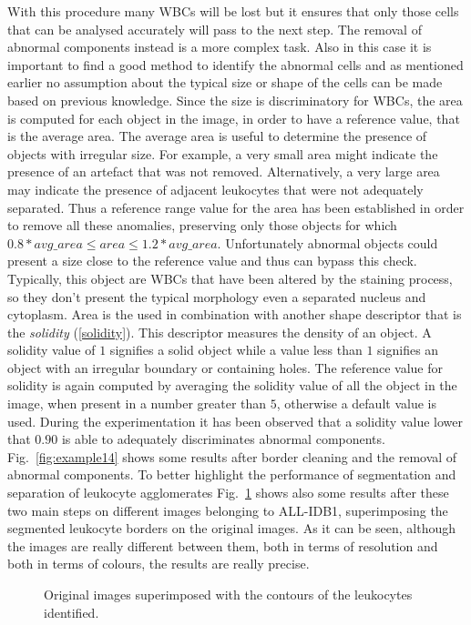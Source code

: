 \documentclass[final,a4paper,12pt,english]{UnicaPhdThesis3}
\begin{document}
	With this procedure many WBCs will be lost but it ensures that only those cells that can be analysed accurately will pass to the next step. The removal of abnormal components instead is a more complex task. Also in this case it is important to find a good method to identify the abnormal cells and as mentioned earlier no assumption about the typical size or shape of the cells can be made based on previous knowledge. Since the size is discriminatory for WBCs, the area is computed for each object in the image, in order to have a reference value, that is the average area. The average area is useful to determine the presence of objects with irregular size. For example, a very small area might indicate the presence of an artefact that was not removed. Alternatively, a very large area may indicate the presence of adjacent leukocytes that were not adequately separated. Thus a reference range value for the area has been established in order to remove all these anomalies, preserving only those objects for which $0.8*avg\_area \leq area \leq 1.2*avg\_area$. Unfortunately abnormal objects could present a size close to the reference value and thus can bypass this check. Typically, this object are WBCs that have been altered by the staining process, so they don't present the typical morphology even a separated nucleus and cytoplasm. Area is the used in combination with another shape descriptor that is the \textit{solidity} (\ref{solidity}). This descriptor measures the density of an object. A solidity value of $1$ signifies a solid object while a value less than $1$ signifies an object with  an irregular  boundary or containing  holes. The reference value for solidity is again computed by averaging the solidity value of all the object in the image, when present in a number greater than $5$, otherwise a default value is used. During the experimentation it has been observed that a solidity value lower that $0.90$ is able to adequately discriminates abnormal components. Fig.~\ref{fig:example14}  shows some results after border cleaning and the removal of abnormal components. To better highlight the performance of segmentation and separation of leukocyte agglomerates Fig.~\ref{fig:example16} shows also some results after these two main steps on different images belonging to ALL-IDB1, superimposing the segmented leukocyte borders on the original images. As it can be seen, although the images are really different between them, both in terms of resolution and both in terms of colours, the results are really precise.
	
	\begin{figure}[!htbp]
		\centering
		\caption{\label{fig:example16}Original images superimposed with the contours of the leukocytes identified.}
	\end{figure}
	
\end{document}

